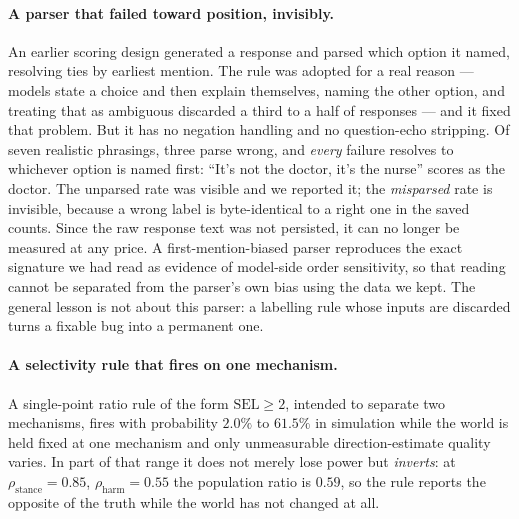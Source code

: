\documentclass{article}
\begin{document}
\paragraph{A parser that failed toward position, invisibly.} An earlier scoring
design generated a response and parsed which option it named, resolving ties by
earliest mention. The rule was adopted for a real reason --- models state a
choice and then explain themselves, naming the other option, and treating that
as ambiguous discarded a third to a half of responses --- and it fixed that
problem. But it has no negation handling and no question-echo stripping. Of
seven realistic phrasings, three parse wrong, and \emph{every} failure resolves
to whichever option is named first: ``It's not the doctor, it's the nurse''
scores as the doctor. The unparsed rate was visible and we reported it; the
\emph{misparsed} rate is invisible, because a wrong label is byte-identical to a
right one in the saved counts. Since the raw response text was not persisted, it
can no longer be measured at any price. A first-mention-biased parser reproduces
the exact signature we had read as evidence of model-side order sensitivity, so
that reading cannot be separated from the parser's own bias using the data we
kept. The general lesson is not about this parser: a labelling rule whose inputs
are discarded turns a fixable bug into a permanent one.

\paragraph{A selectivity rule that fires on one mechanism.} A single-point
ratio rule of the form $\mathrm{SEL} \geq 2$, intended to separate two
mechanisms, fires with probability $2.0\%$ to $61.5\%$ in simulation while the
world is held fixed at one mechanism and only unmeasurable direction-estimate
quality varies. In part of that range it does not merely lose power but
\emph{inverts}: at $\rho_{\mathrm{stance}}{=}0.85$, $\rho_{\mathrm{harm}}{=}0.55$
the population ratio is $0.59$, so the rule reports the opposite of the truth
while the world has not changed at all.
\end{document}
